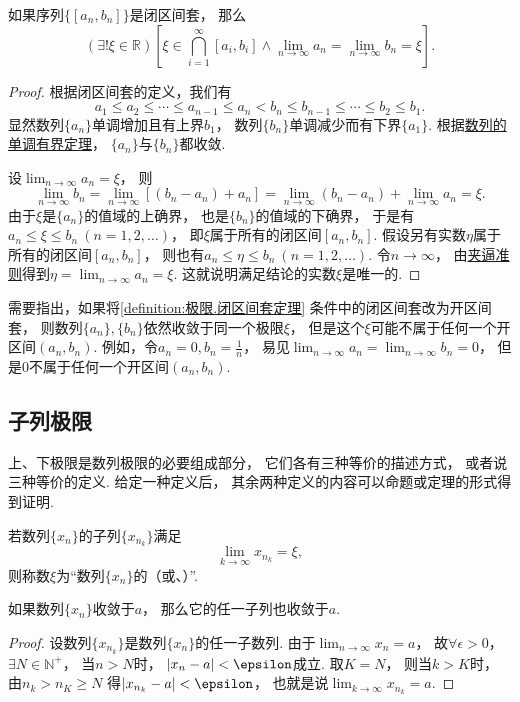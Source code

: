 \begin{theorem}[闭区间套定理]\label{definition:极限.闭区间套定理}
如果序列\(\{[a_n,b_n]\}\)是闭区间套，
那么\[
	(\exists!\xi\in\mathbb{R})
	\left[
		\xi \in \bigcap_{i=1}^\infty [a_i,b_i]
		\land
		\lim_{n\to\infty} a_n = \lim_{n\to\infty} b_n = \xi
	\right].
\]
\begin{proof}
根据闭区间套的定义，我们有\[
	a_1 \leq a_2 \leq \dotsb \leq a_{n-1} \leq a_n
	< b_n \leq b_{n-1} \leq \dotsb \leq b_2 \leq b_1.
\]
显然数列\(\{a_n\}\)单调增加且有上界\(b_1\)，
数列\(\{b_n\}\)单调减少而有下界\(\{a_1\}\).
根据\hyperref[theorem:极限.数列的单调有界定理]{数列的单调有界定理}，
\(\{a_n\}\)与\(\{b_n\}\)都收敛.

设\(\lim_{n\to\infty} a_n = \xi\)，
则\[
	\lim_{n\to\infty} b_n
	= \lim_{n\to\infty} [(b_n - a_n) + a_n]
	= \lim_{n\to\infty} (b_n - a_n) + \lim_{n\to\infty} a_n
	= \xi.
\]
由于\(\xi\)是\(\{a_n\}\)的值域的上确界，
也是\(\{b_n\}\)的值域的下确界，
于是有\(a_n \leq \xi \leq b_n\ (n=1,2,\dotsc)\)，
即\(\xi\)属于所有的闭区间\([a_n,b_n]\).
假设另有实数\(\eta\)属于所有的闭区间\([a_n,b_n]\)，
则也有\(a_n \leq \eta \leq b_n\ (n=1,2,\dotsc)\).
令\(n\to\infty\)，
由\hyperref[theorem:极限.夹逼准则]{夹逼准则}得到\(\eta=\lim_{n\to\infty} a_n=\xi\).
这就说明满足结论的实数\(\xi\)是唯一的.
\end{proof}
\end{theorem}

需要指出，如果将\cref{definition:极限.闭区间套定理} 条件中的闭区间套改为开区间套，
则数列\(\{a_n\},\{b_n\}\)依然收敛于同一个极限\(\xi\)，
但是这个\(\xi\)可能不属于任何一个开区间\((a_n,b_n)\).
例如，令\(a_n = 0, b_n = \frac1n\)，
易见\(\lim_{n\to\infty} a_n = \lim_{n\to\infty} b_n = 0\)，
但是\(0\)不属于任何一个开区间\((a_n,b_n)\).

\subsection{子列极限}
上、下极限是数列极限的必要组成部分，
它们各有三种等价的描述方式，
或者说三种等价的定义.
给定一种定义后，
其余两种定义的内容可以命题或定理的形式得到证明.

\begin{definition}
若数列\(\{x_n\}\)的子列\(\{x_{n_k}\}\)满足\[
	\lim_{k\to\infty} x_{n_k} = \xi,
\]
则称数\(\xi\)为“数列\(\{x_n\}\)的（或、）”.
\end{definition}

\begin{theorem}\label{theorem:子列极限.数列收敛的充分必要条件}
如果数列\(\{x_n\}\)收敛于\(a\)，
那么它的任一子列也收敛于\(a\).
\begin{proof}
设数列\(\{x_{n_k}\}\)是数列\(\{x_n\}\)的任一子数列.
由于\(\lim_{n\to\infty}x_n = a\)，
故\(\forall \epsilon > 0\)，
\(\exists N \in \mathbb{N}^+\)，
当\(n > N\)时，
\(\abs{x_n - a} < \epsilon\)成立.
取\(K = N\)，
则当\(k > K\)时，
由\(n_k > n_K \geq N\)
得\(\abs{x_{n_k} - a} < \epsilon\)，
也就是说\(\lim_{k\to\infty}x_{n_k} = a\).
\end{proof}
\end{theorem}

